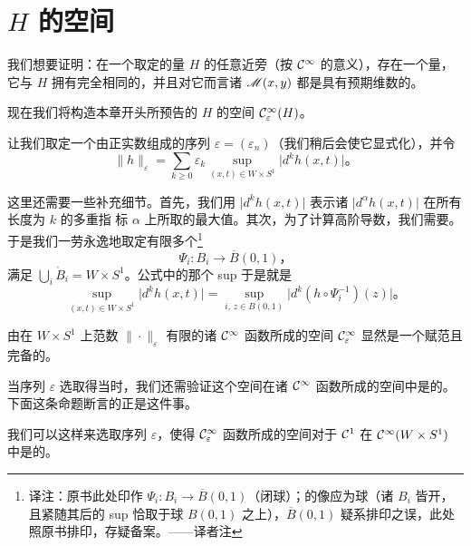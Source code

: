 
\section{\texorpdfstring{$H$}{H} 的\trPerturbation{}空间}
\label{sec:perturbations-h}

我们想要证明：在一个取定的\trHamiltonian{}量 $H$ 的任意近旁（按 $\mathcal{C}^{\infty}$ \trTopology{}的意义），存在一个\trHamiltonian{}量，它与 $H$ 拥有完全相同的\trPeriodic\trTrajectory，并且对它而言诸 $\mathscr{M}(x,y)$ 都是具有预期维数的\trManifold。

现在我们将构造本章开头所预告的 $H$ 的\trPerturbation{}空间 $\mathcal{C}^{\infty}_{\varepsilon}(H)$。

让我们取定一个由正实数组成的序列 $\varepsilon=(\varepsilon_{n})$（我们稍后会使它显式化），并令
\[
\|h\|_{\varepsilon}=\sum_{k\ge0}\varepsilon_{k}\sup_{(x,t)\in W\times S^{1}}\bigl|d^{k}h(x,t)\bigr|\text{。}
\]

这里还需要一些补充细节。首先，我们用 $\bigl|d^{k}h(x,t)\bigr|$ 表示诸 $\bigl|d^{\alpha}h(x,t)\bigr|$ 在所有长度为 $k$ 的多重指%
标 $\alpha$ 上所取的最大值。其次，为了计算高阶导数，我们需要\trChart。于是我们一劳永逸地取定有限多个\trDiffeomorphism\footnote{译注：原书此处印作 $\Psi_{i}\colon B_{i}\to\overline{B}(0,1)$（闭球）；\trDiffeomorphism{}的像应为\trOpen{}球（诸 $B_{i}$ 皆开，且紧随其后的 sup 恰取于\trOpen{}球 $B(0,1)$ 之上），$\overline{B}(0,1)$ 疑系排印之误，此处照原书排印，存疑备案。——译者注}
\[
\Psi_{i}\colon B_{i}\longrightarrow\overline{B}(0,1)\text{，}
\]
满足 $\bigcup_{i}\mathring{B}_{i}=W\times S^{1}$。公式中的那个 sup 于是就是
\[
\sup_{(x,t)\in W\times S^{1}}\bigl|d^{k}h(x,t)\bigr|=\sup_{i,\,z\in B(0,1)}\bigl|d^{k}(h\circ\Psi_{i}^{-1})(z)\bigr|\text{。}
\]

由在 $W\times S^{1}$ 上范数 $\|\cdot\|_{\varepsilon}$ 有限的诸 $\mathcal{C}^{\infty}$ 函数所成的空间 $\mathcal{C}^{\infty}_{\varepsilon}$ 显然是一个赋范且完备的\trVectorSpace。

当序列 $\varepsilon$ 选取得当时，我们还需验证这个空间在诸 $\mathcal{C}^{\infty}$ 函数所成的空间中是\trDense{}的。下面这条命题断言的正是这件事。

\begin{proposition}\label{thm:epsilon-dense}
我们可以这样来选取序列 $\varepsilon$，使得 $\mathcal{C}^{\infty}_{\varepsilon}$ 函数所成的空间对于 $\mathcal{C}^{1}$ \trTopology{}在 $\mathcal{C}^{\infty}(W\times S^{1})$ 中是\trDense{}的。
\end{proposition}

